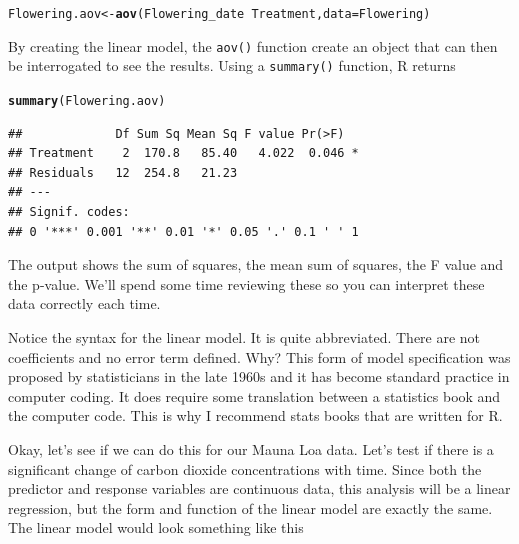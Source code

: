 \documentclass{tufte-handout}\usepackage[]{graphicx}\usepackage[]{xcolor}
\makeatletter
\newcommand{\hlopt}[1]{\textcolor[rgb]{0,0,0}{#1}}%
\newcommand{\hlstd}[1]{\textcolor[rgb]{0.345,0.345,0.345}{#1}}%
\newcommand{\hlkwb}[1]{\textcolor[rgb]{0.69,0.353,0.396}{#1}}%
\newcommand{\hlkwc}[1]{\textcolor[rgb]{0.333,0.667,0.333}{#1}}%
\newcommand{\hlkwd}[1]{\textcolor[rgb]{0.737,0.353,0.396}{\textbf{#1}}}%
\newenvironment{kframe}{%
 \def\at@end@of@kframe{}%
 \ifinner\ifhmode%
  \def\at@end@of@kframe{\end{minipage}}%
  \begin{minipage}{\columnwidth}%
 \fi\fi%
 \def\FrameCommand##1{\hskip\@totalleftmargin \hskip-\fboxsep
 \colorbox{shadecolor}{##1}\hskip-\fboxsep
     \hskip-\linewidth \hskip-\@totalleftmargin \hskip\columnwidth}%
 \MakeFramed {\advance\hsize-\width
   \@totalleftmargin\z@ \linewidth\hsize
   \@setminipage}}%
 {\par\unskip\endMakeFramed%
 \at@end@of@kframe}
\newenvironment{knitrout}{}{} %
\makeatother
\begin{document}
\begin{knitrout}
\color{fgcolor}\begin{kframe}
\begin{alltt}
\hlstd{Flowering.aov} \hlkwb{<-} \hlkwd{aov}\hlstd{(Flowering_date} \hlopt{~} \hlstd{Treatment,} \hlkwc{data}\hlstd{=Flowering)}
\end{alltt}
\end{kframe}
\end{knitrout}

By creating the linear model, the \texttt{aov()} function create an object that can then be interrogated to see the results. Using a \texttt{summary()} function, R returns

\begin{knitrout}
\color{fgcolor}\begin{kframe}
\begin{alltt}
\hlkwd{summary}\hlstd{(Flowering.aov)}
\end{alltt}
\begin{verbatim}
##             Df Sum Sq Mean Sq F value Pr(>F)  
## Treatment    2  170.8   85.40   4.022  0.046 *
## Residuals   12  254.8   21.23                 
## ---
## Signif. codes:  
## 0 '***' 0.001 '**' 0.01 '*' 0.05 '.' 0.1 ' ' 1
\end{verbatim}
\end{kframe}
\end{knitrout}

The output shows the sum of squares, the mean sum of squares, the F value and the p-value. We'll spend some time reviewing these so you can interpret these data correctly each time.

Notice the syntax for the linear model. It is quite abbreviated. There are not coefficients and no error term defined. Why?  This form of model specification was proposed by statisticians in the late 1960s and it has become standard practice in computer coding. It does require some translation between a statistics book and the computer code. This is why I recommend stats books that are written for R.  

Okay, let's see if we can do this for our Mauna Loa data. Let's test if there is a significant change of carbon dioxide concentrations with time. Since both the predictor and response variables are continuous data, this analysis will be a linear regression, but the form and function of the linear model are exactly the same. The linear model would look something like this
\end{document}
